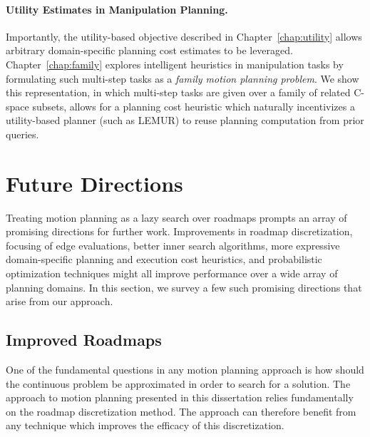 \paragraph{Utility Estimates in Manipulation Planning.}
Importantly,
the utility-based objective described in Chapter~\ref{chap:utility}
allows arbitrary domain-specific planning cost estimates
to be leveraged.
Chapter~\ref{chap:family} explores intelligent heuristics
in manipulation tasks by formulating such multi-step tasks as
a \emph{family motion planning problem}.
We show this representation,
in which multi-step tasks are given over a family of related
C-space subsets,
allows for a planning cost heuristic
which naturally incentivizes a utility-based planner (such as LEMUR)
to reuse planning computation from prior queries.


\section{Future Directions}
\label{sec:conclusion:future}

Treating motion planning as a lazy search over roadmaps
prompts an array of promising directions for further work.
Improvements in roadmap discretization,
focusing of edge evaluations,
better inner search algorithms,
more expressive domain-specific planning and execution cost
heuristics,
and probabilistic optimization techniques might all improve performance
over a wide array of planning domains.
In this section,
we survey a few such promising directions that arise from our
approach.


\subsection{Improved Roadmaps}
\label{subsec:conclusion:future-roadmaps}

One of the fundamental questions in any motion planning approach
is how should the continuous problem be approximated in order
to search for a solution.
The approach to motion planning presented in this dissertation
relies fundamentally on the roadmap discretization method.
The approach can therefore benefit from any technique which improves
the efficacy of this discretization.

